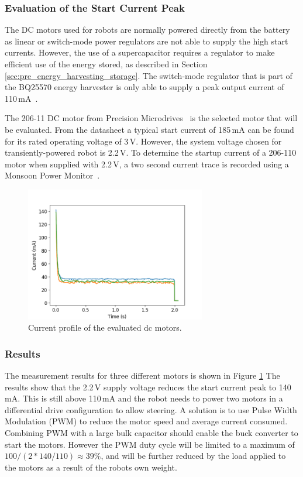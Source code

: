 \subsubsection{Evaluation of the Start Current Peak}
The DC motors used for robots are normally powered directly from the battery as linear or switch-mode power regulators are not able to supply the high start currents.
However, the use of a supercapacitor requires a regulator to make efficient use of the energy stored, as described in Section \ref{sec:pre_energy_harvesting_storage}.
The switch-mode regulator that is part of the BQ25570 energy harvester is only able to supply a peak output current of 110\,mA~\cite{bq25570_2017}.

The 206-11 DC motor from Precision Microdrives~\cite{gearmotor_206-110_2017} is the selected motor that will be evaluated.
From the datasheet a typical start current of 185\,mA can be found for its rated operating voltage of 3\,V.
However, the system voltage chosen for transiently-powered robot is 2.2\,V.
To determine the startup current of a 206-110 motor when supplied with 2.2\,V, a two second current trace is recorded using a Monsoon Power Monitor~\cite{monsoon_powermonitor_2017}.


\begin{figure}%
	\centering
	\includegraphics[width=0.7\textwidth]{pics/free_running_current.png}
	\caption{Current profile of the evaluated dc motors.}
	\label{fig:free_running_current}
\end{figure}

\subsubsection{Results}
The measurement results for three different motors is shown in Figure \ref{fig:free_running_current}
The results show that the 2.2\,V supply voltage reduces the start current peak to 140\,mA.
This is still above 110\,mA and the robot needs to power two motors in a differential drive configuration to allow steering.
A solution is to use Pulse Width Modulation (PWM) to reduce the motor speed and average current consumed.
Combining PWM with a large bulk capacitor should enable the buck converter to start the motors.
However the PWM duty cycle will be limited to a maximum of $100/(2*140/110) \approx 39\%$, and will be further reduced by the load applied to the motors as a result of the robots own weight.


